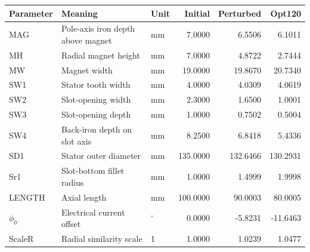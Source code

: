 \begin{tabular}{l>{\raggedright\arraybackslash}p{.28\linewidth}lrrr}\toprule
Parameter & Meaning & Unit & Initial & Perturbed & Opt120\\\midrule
MAG & Pole-axis iron depth above magnet & mm & 7.0000 & 6.5506 & 6.1011 \\
MH & Radial magnet height & mm & 7.0000 & 4.8722 & 2.7444 \\
MW & Magnet width & mm & 19.0000 & 19.8670 & 20.7340 \\
SW1 & Stator tooth width & mm & 4.0000 & 4.0309 & 4.0619 \\
SW2 & Slot-opening width & mm & 2.3000 & 1.6500 & 1.0001 \\
SW3 & Slot-opening depth & mm & 1.0000 & 0.7502 & 0.5004 \\
SW4 & Back-iron depth on slot axis & mm & 8.2500 & 6.8418 & 5.4336 \\
SD1 & Stator outer diameter & mm & 135.0000 & 132.6466 & 130.2931 \\
Sr1 & Slot-bottom fillet radius & mm & 1.0000 & 1.4999 & 1.9998 \\
LENGTH & Axial length & mm & 100.0000 & 90.0003 & 80.0005 \\
$\phi_0$ & Electrical current offset & $^\circ$ & 0.0000 & -5.8231 & -11.6463 \\
ScaleR & Radial similarity scale & 1 & 1.0000 & 1.0239 & 1.0477 \\
\bottomrule\end{tabular}
